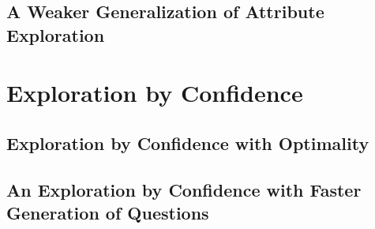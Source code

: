 
\subsection{A Weaker Generalization of Attribute Exploration}
\label{sec:weak-gener-attr}


\section{Exploration by Confidence}
\label{sec:expl-conf}


\subsection{Exploration by Confidence with Optimality}
\label{sec:expl-conf-1}


\subsection{An Exploration by Confidence with Faster Generation of Questions}
\label{sec:poss-fast-expl}



